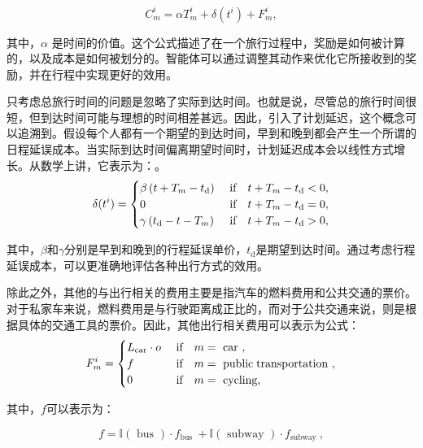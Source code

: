 \begin{equation}
C_{m}^{i}=\alpha T_{m}^{i}+\delta\left(t^{i}\right)+F_{m}^{i},\label{costfunction}
\end{equation}

其中，$\alpha$ 是时间的价值。这个公式描述了在一个旅行过程中，奖励是如何被计算的，以及成本是如何被划分的。智能体可以通过调整其动作来优化它所接收到的奖励，并在行程中实现更好的效用。

只考虑总旅行时间的问题是忽略了实际到达时间。也就是说，尽管总的旅行时间很短，但到达时间可能与理想的时间相差甚远。因此，引入了计划延迟，这个概念可以追溯到\cite{small1982scheduling}。假设每个人都有一个期望的到达时间，早到和晚到都会产生一个所谓的日程延误成本。当实际到达时间偏离期望时间时，计划延迟成本会以线性方式增长。从数学上讲，它表示为：。
\begin{equation}
\delta(t^i)= 
\begin{cases}\beta\left(t+T_{m}-t_\text{d}\right) & \text { if\quad } t+T_{m}-t_\text {d}<0, \\ 
0 & \text { if\quad } t+T_{m}-t_\text {d}=0, \\ 
\gamma\left(t_\text {d}-t-T_{m}\right) & \text { if\quad } t+T_{m}-t_\text {d}>0,
\end{cases}
\end{equation}

其中，$\beta$和$\gamma$分别是早到和晚到的行程延误单价，$t_\text{d}$是期望到达时间。通过考虑行程延误成本，可以更准确地评估各种出行方式的效用。

除此之外，其他的与出行相关的费用主要是指汽车的燃料费用和公共交通的票价。对于私家车来说，燃料费用是与行驶距离成正比的，而对于公共交通来说，则是根据具体的交通工具的票价。因此，其他出行相关费用可以表示为公式：
\begin{equation}
F_{m}^i= 
\begin{cases}
L_\text{car} \cdot o  & \text { if\quad  } m=\text { car }, \\ 
f  & \text { if\quad  } m=\text { public\;transportation }, \\ 
0   &  \text { if\quad } m=\text {  cycling,}
\end{cases}
\end{equation} 

其中，$f$可以表示为：

\begin{equation}
f=\mathbb{I}(\text { bus }) \cdot f_{\text {bus }}+\mathbb{I}(\text { subway }) \cdot f_{\text {subway }},
\end{equation}

